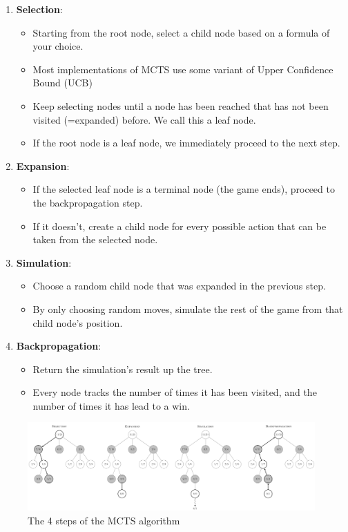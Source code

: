 \documentclass{article}
\begin{document}
\begin{enumerate}
    \item \textbf{Selection}:
    \begin{itemize}
        \item Starting from the root node, select a child node based on a formula of your choice.
        \item Most implementations of MCTS use some variant of Upper Confidence Bound (UCB) \cite{MLMonteCarlo2019}
        \item Keep selecting nodes until a node has been reached that has not been visited (=expanded) before. We call this a leaf node.
        \item If the root node is a leaf node, we immediately proceed to the next step.
    \end{itemize}
    \item \textbf{Expansion}:
    \begin{itemize}
        \item If the selected leaf node is a terminal node (the game ends), proceed to the backpropagation step.
        \item If it doesn't, create a child node for every possible action that can be taken from the selected node.
    \end{itemize}
    \item \textbf{Simulation}:
    \begin{itemize}
        \item Choose a random child node that was expanded in the previous step.
        \item By only choosing random moves, simulate the rest of the game from that child node's position.
    \end{itemize}
    \item \textbf{Backpropagation}:
    \begin{itemize}
        \item Return the simulation's result up the tree.
        \item Every node tracks the number of times it has been visited, and the number of times it has lead to a win.
    \end{itemize}
\end{enumerate}


\begin{figure}[H]
    \centering
    \includegraphics[width=0.98\textwidth]{img/MCTS-steps.png}
    \caption{The 4 steps of the MCTS algorithm \cite{MonteCarloTree2022}}
\end{figure}
\end{document}
